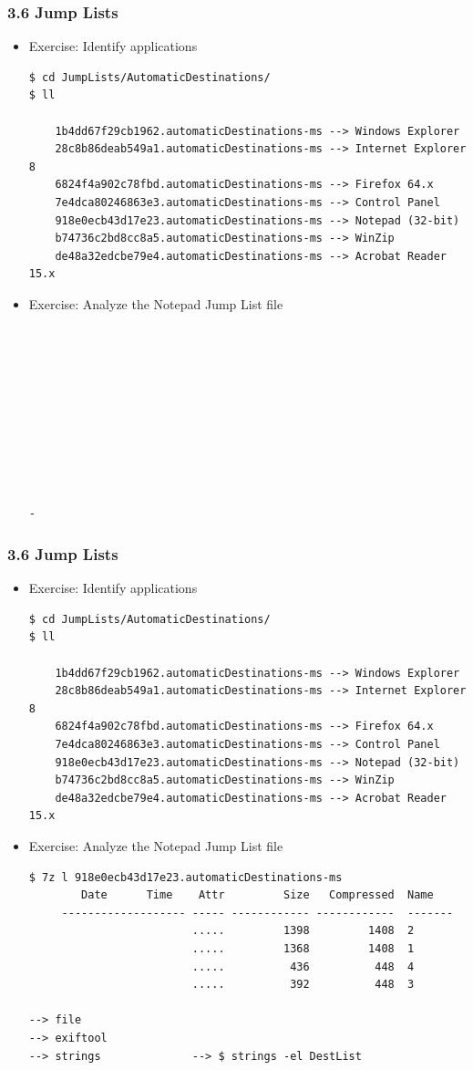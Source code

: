\begin{frame}[fragile]
  \frametitle{3.6 Jump Lists}
    \begin{itemize}
        \item Exercise: Identify applications
  \begin{lstlisting}[basicstyle=\tiny]
$ cd JumpLists/AutomaticDestinations/
$ ll

    1b4dd67f29cb1962.automaticDestinations-ms --> Windows Explorer
    28c8b86deab549a1.automaticDestinations-ms --> Internet Explorer 8
    6824f4a902c78fbd.automaticDestinations-ms --> Firefox 64.x
    7e4dca80246863e3.automaticDestinations-ms --> Control Panel
    918e0ecb43d17e23.automaticDestinations-ms --> Notepad (32-bit)
    b74736c2bd8cc8a5.automaticDestinations-ms --> WinZip
    de48a32edcbe79e4.automaticDestinations-ms --> Acrobat Reader 15.x
  \end{lstlisting}
	\item Exercise: Analyze the Notepad Jump List file
  \begin{lstlisting}[basicstyle=\tiny]










-
  \end{lstlisting}
    \end{itemize}
\end{frame}


\begin{frame}[fragile]
  \frametitle{3.6 Jump Lists}
    \begin{itemize}
        \item Exercise: Identify applications
  \begin{lstlisting}[basicstyle=\tiny]
$ cd JumpLists/AutomaticDestinations/
$ ll

    1b4dd67f29cb1962.automaticDestinations-ms --> Windows Explorer
    28c8b86deab549a1.automaticDestinations-ms --> Internet Explorer 8
    6824f4a902c78fbd.automaticDestinations-ms --> Firefox 64.x
    7e4dca80246863e3.automaticDestinations-ms --> Control Panel
    918e0ecb43d17e23.automaticDestinations-ms --> Notepad (32-bit)
    b74736c2bd8cc8a5.automaticDestinations-ms --> WinZip
    de48a32edcbe79e4.automaticDestinations-ms --> Acrobat Reader 15.x
  \end{lstlisting}
	\item Exercise: Analyze the Notepad Jump List file
  \begin{lstlisting}[basicstyle=\tiny]
$ 7z l 918e0ecb43d17e23.automaticDestinations-ms
        Date      Time    Attr         Size   Compressed  Name
     ------------------- ----- ------------ ------------  -------
                         .....         1398         1408  2
                         .....         1368         1408  1
                         .....          436          448  4
                         .....          392          448  3

--> file
--> exiftool
--> strings              --> $ strings -el DestList
  \end{lstlisting}
    \end{itemize}
\end{frame}




